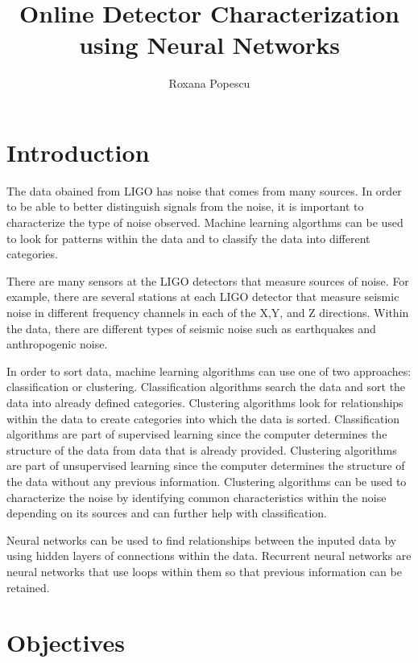 \documentclass[colorlinks=true,pdfstartview=FitV,linkcolor=blue,
            citecolor=red,urlcolor=magenta]{ligodoc}
\title{Online Detector Characterization using Neural Networks}
\author{Roxana Popescu}
\begin{document}
\section{Introduction} 

\indent

\par The data obained from LIGO has noise that comes from many sources. In order to be able to better distinguish signals from the noise, it is important to characterize the type of noise observed. Machine learning algorthms can be used to look for patterns within the data and to classify the data into different categories.

\par There are many sensors at the LIGO detectors that measure sources of noise. For example, there are several stations at each LIGO detector that measure seismic noise in different frequency channels in each of the X,Y, and Z directions. Within the data, there are different types of seismic noise such as earthquakes and anthropogenic noise.  

\par In order to sort data, machine learning algorithms can use one of two approaches: classification or clustering. Classification algorithms search the data and sort the data into already defined categories. Clustering algorithms look for relationships within the data to create categories into which the data is sorted. Classification algorithms are part of supervised learning since the computer determines the structure of the data from data that is already provided. Clustering algorithms are part of unsupervised learning since the computer determines the structure of the data without any previous information. Clustering algorithms can be used to characterize the noise by identifying common characteristics within the noise depending on its sources and can further help with classification. \cite{Citation1}

\par Neural networks can be used to find relationships between the inputed data by using hidden layers of connections within the data. Recurrent neural networks are neural networks that use loops within them so that previous information can be retained. \cite{Citation1}

\section{Objectives}

\indent
\end{document}
